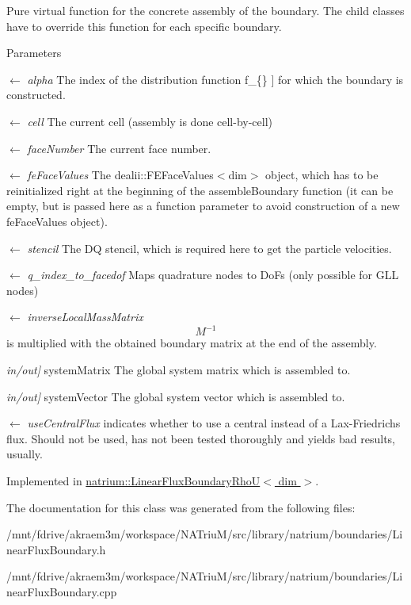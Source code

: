 Pure virtual function for the concrete assembly of the boundary. The child classes have to override this function for each specific boundary. 
\begin{DoxyParams}{Parameters}
\item[\mbox{$\leftarrow$} {\em alpha}]The index of the distribution function  f\_\-\{\} \mbox{]} for which the boundary is constructed. \item[\mbox{$\leftarrow$} {\em cell}]The current cell (assembly is done cell-\/by-\/cell) \item[\mbox{$\leftarrow$} {\em faceNumber}]The current face number. \item[\mbox{$\leftarrow$} {\em feFaceValues}]The dealii::FEFaceValues$<$dim$>$ object, which has to be reinitialized right at the beginning of the assembleBoundary function (it can be empty, but is passed here as a function parameter to avoid construction of a new feFaceValues object). \item[\mbox{$\leftarrow$} {\em stencil}]The DQ stencil, which is required here to get the particle velocities. \item[\mbox{$\leftarrow$} {\em q\_\-index\_\-to\_\-facedof}]Maps quadrature nodes to DoFs (only possible for GLL nodes) \item[\mbox{$\leftarrow$} {\em inverseLocalMassMatrix}]\[ M^{-1} \] is multiplied with the obtained boundary matrix at the end of the assembly. \item[{\em in/out\mbox{]}}]systemMatrix The global system matrix which is assembled to. \item[{\em in/out\mbox{]}}]systemVector The global system vector which is assembled to. \item[\mbox{$\leftarrow$} {\em useCentralFlux}]indicates whether to use a central instead of a Lax-\/Friedrichs flux. Should not be used, has not been tested thoroughly and yields bad results, usually. \end{DoxyParams}


Implemented in \hyperlink{classnatrium_1_1LinearFluxBoundaryRhoU_a4572f65018de568b40f56921e8f89788}{natrium::LinearFluxBoundaryRhoU$<$ dim $>$}.

The documentation for this class was generated from the following files:\begin{DoxyCompactItemize}
\item 
/mnt/fdrive/akraem3m/workspace/NATriuM/src/library/natrium/boundaries/LinearFluxBoundary.h\item 
/mnt/fdrive/akraem3m/workspace/NATriuM/src/library/natrium/boundaries/LinearFluxBoundary.cpp\end{DoxyCompactItemize}
